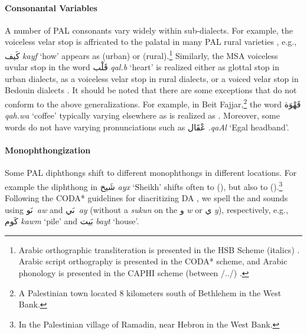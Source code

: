 \paragraph{Consonantal Variables} 
A number of PAL consonants vary widely within sub-dialects. 
For example, the  voiceless velar stop  is affricated to the palatal   in many PAL rural varieties \citep{herzallah1990aspects}, e.g., \foreignlanguage{arabic}{كَيف} 
{\it kayf} `how' appears as  (urban) or  (rural).\footnote{Arabic orthographic transliteration is presented in the HSB Scheme (italics) \citep{Habash:2007:arabic-transliteration}. Arabic script orthography is presented in the CODA* scheme, and Arabic phonology is presented in the CAPHI scheme (between /../) \citep{Habash:2018:unified}.}
%
Similarly, the MSA voiceless uvular stop  in the word \foreignlanguage{arabic}{قَلْب} 
{\it qal.b}
`heart'  is realized either as glottal stop  in urban dialects, as a voiceless velar stop  in rural dialects, or a voiced velar stop  in Bedouin dialects \citep{herzallah1990aspects}. 
%
It should be noted that there are some exceptions that do not conform to the above generalizations. For example, in Beit Fajjar,\footnote{A Palestinian town located 8 kilometers south of Bethlehem in the West Bank.} the word \foreignlanguage{arabic}{قَهْوَة} 
{\it qah.wa{\TAMARBUTA}}
`coffee' typically varying elsewhere  as  is realized as .
Moreover, some words do not have varying pronunciations such as \foreignlanguage{arabic}{عْقَال} 
{\it {\AYN}.qaAl}
 `Egal headband'.



\paragraph{Monophthongization} 
Some PAL diphthongs shift to different monophthongs in different locations. 
For example the  diphthong in \foreignlanguage{arabic}{شَيخ}
{\it {\SHIN}ayx}  `Sheikh' shifts often to  (), but also to  ().\footnote{In the Palestinian village of Ramadin, near Hebron in the West Bank.}
%
Following the CODA*  guidelines for diacritizing DA \citep{Habash:2018:unified}, we spell the  and  sounds using 
\foreignlanguage{arabic}{ىَو}~{\it aw}
and \foreignlanguage{arabic}{ىَي}~{\it ay} 
(without a \textit{sukun} on the \foreignlanguage{arabic}{و} \textit{w} or \foreignlanguage{arabic}{ي} 
\textit{y}), respectively, e.g.,
\foreignlanguage{arabic}{كَوم} \textit{kawm}  `pile' and \foreignlanguage{arabic}{بَيت}
\textit{bayt}  `house'.


